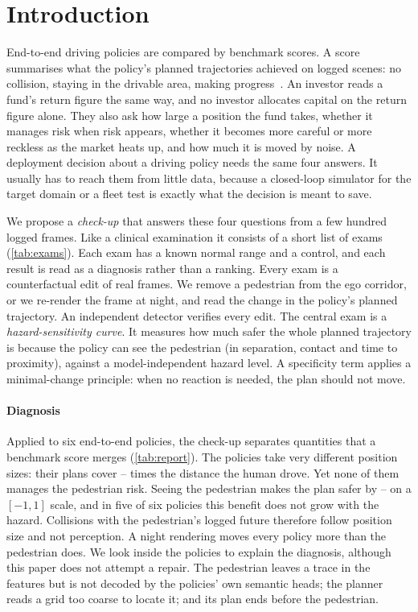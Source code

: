 \section{Introduction}
\label{sec:intro}

End-to-end driving policies are compared by benchmark scores. A score summarises what the policy's
planned trajectories achieved on logged scenes: no collision, staying in the drivable area, making
progress~\cite{dauner2024navsim,cao2025pseudosim}. An investor reads a fund's return figure the same
way, and no investor allocates capital on the return figure alone. They also ask how large a position
the fund takes, whether it manages risk when risk appears, whether it becomes more careful or more
reckless as the market heats up, and how much it is moved by noise. A deployment decision about a
driving policy needs the same four answers. It usually has to reach them from little data, because a
closed-loop simulator for the target domain or a fleet test is exactly what the decision is meant to
save.

We propose a \emph{check-up} that answers these four questions from a few hundred logged frames. Like
a clinical examination it consists of a short list of exams (\cref{tab:exams}). Each exam has a known
normal range and a control, and each result is read as a diagnosis rather than a ranking. Every exam is
a counterfactual edit of real frames. We remove a pedestrian from the ego corridor, or we re-render the
frame at night, and read the change in the policy's planned trajectory. An independent detector
verifies every edit. The central exam is a \emph{hazard-sensitivity curve}. It measures how much safer
the whole planned trajectory is because the policy can see the pedestrian (in separation, contact and
time to proximity), against a model-independent hazard level. A specificity term applies a
minimal-change principle: when no reaction is needed, the plan should not move.

\paragraph{Diagnosis}
Applied to six end-to-end policies, the check-up separates quantities that a benchmark score merges
(\cref{tab:report}). The policies take very different position sizes: their plans cover
\NumExpLo--\NumExpHi{} times the distance the human drove. Yet none of them manages the pedestrian
risk. Seeing the pedestrian makes the plan safer by \NumHSlo--\NumHShi{} on a $[-1,1]$ scale, and in
five of six policies this benefit does not grow with the hazard. Collisions with the pedestrian's
logged future therefore follow position size and not perception. A night rendering moves every policy
more than the pedestrian does. We look inside the policies to explain the diagnosis, although this
paper does not attempt a repair. The pedestrian leaves a trace in the features but is not decoded by the policies' own semantic
heads; the planner reads a grid too coarse to locate it; and its plan ends before the pedestrian.

